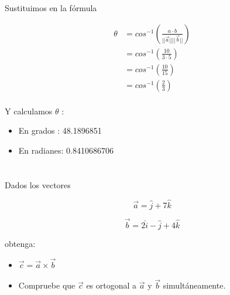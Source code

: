 \documentclass[12pt]{article}
\begin{document}
Sustituimos en la fórmula

\begin{equation*}
  \begin{split}
    \theta &= cos^{-1 }\left(\frac{a \cdot b}{||\vec{a}|| ||\vec{b}||}\right) \\
    &=  cos^{-1 }\left(\frac{10}{3 \cdot 5} \right) \\
    &= cos^{-1 }\left(\frac{10}{15} \right) \\
    &= cos^{-1 }\left(\frac{2}{3} \right) \\
  \end{split}
\end{equation*}

Y  calculamos $\theta$ :

\begin{itemize}
  
\item En grados : 48.1896851
  
\item En radianes: 0.8410686706
  
\end{itemize}

\section{}

Dados los vectores

\[\vec{a} = \hat{j}+ 7\hat{k}\]

\[\vec{b} = 2\hat{i} - \hat{j}+ 4\hat{k}\]

obtenga:

\begin{itemize}

\item $\vec{c}=\vec{a} \times \vec{b}$

\item Compruebe que $\vec{c}$ es ortogonal a $\vec{a}$ y $\vec{b}$ simultáneamente.

\end{itemize}

\section{}
\end{document}
